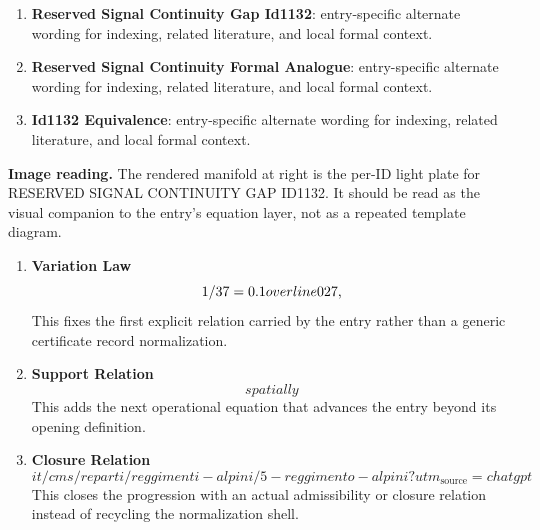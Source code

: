 \begin{enumerate}[leftmargin=1.6em,itemsep=6pt,topsep=4pt]
\item \textbf{Reserved Signal Continuity Gap Id1132}: entry-specific alternate wording for indexing, related literature, and local formal context.
\item \textbf{Reserved Signal Continuity Formal Analogue}: entry-specific alternate wording for indexing, related literature, and local formal context.
\item \textbf{Id1132 Equivalence}: entry-specific alternate wording for indexing, related literature, and local formal context.
\end{enumerate}

\begin{samepage}
\noindent\begin{minipage}[t]{0.45\linewidth}
\vspace{0pt}
\raggedright
\scriptsize\textbf{Image reading.} The rendered manifold at right is the per-ID light plate for RESERVED SIGNAL CONTINUITY GAP ID1132. It should be read as the visual companion to the entry's equation layer, not as a repeated template diagram.\par
\end{minipage}\hfill
\begin{minipage}[t]{0.53\linewidth}
\vspace*{-0.10in}
\raggedright
{}
\end{minipage}
\end{samepage}

\clearpage


\begin{enumerate}[leftmargin=1.6em,itemsep=9pt,topsep=6pt]
\item \textbf{Variation Law}
\[
1/37=0.1overline{027}$,$
\]
This fixes the first explicit relation carried by the entry rather than a generic certificate record normalization.

\item \textbf{Support Relation}
\[
spatially%
\]
This adds the next operational equation that advances the entry beyond its opening definition.

\item \textbf{Closure Relation}
\[
it/cms/reparti/reggimenti-alpini/5-reggimento-alpini?utm_{\mathrm{source}}=chatgpt
\]
This closes the progression with an actual admissibility or closure relation instead of recycling the normalization shell.
\end{enumerate}

